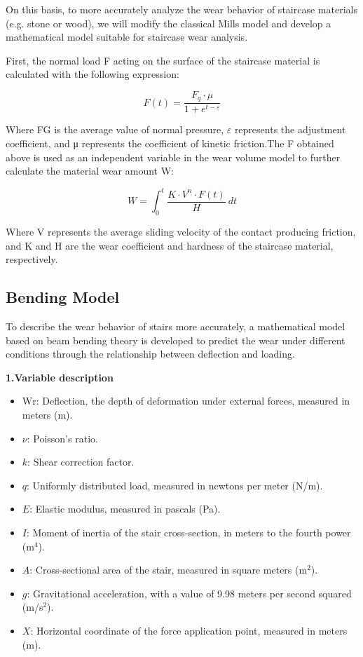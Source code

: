 \documentclass{mcmthesis}
\begin{document}
On this basis, to more accurately analyze the wear behavior of staircase materials (e.g. stone or wood), we will modify the classical Mills model and develop a mathematical model suitable for staircase wear analysis.

First, the normal load F acting on the surface of the staircase material is calculated with the following expression:

\[ F(t) = \frac{F_{q} \cdot \mu}{1 + e^{t - \varepsilon }} \]

Where FG is the average value of normal pressure, $\varepsilon$  represents the adjustment coefficient, and μ represents the coefficient of kinetic friction.The F obtained above is used as an independent variable in the wear volume model to further calculate the material wear amount W:


\[ W = \int_{0}^{t} \frac{K \cdot V^{n} \cdot F(t)}{H} \ dt \]

Where V represents the average sliding velocity of the contact producing friction, and K and H are the wear coefficient and hardness of the staircase material, respectively.
\subsection{Bending Model}
To describe the wear behavior of stairs more accurately, a mathematical model based on beam bending theory is developed to predict the wear under different conditions through the relationship between deflection and loading.

\textbf{1.Variable description}
\begin{itemize}

\item \( \text{Wr} \): Deflection, the depth of deformation under external forces, measured in meters (m). 

\item \( \nu \): Poisson's ratio. 

\item \( k \): Shear correction factor. 

\item \( q \): Uniformly distributed load, measured in newtons per meter (N/m). 

\item \( E \): Elastic modulus, measured in pascals (Pa). 

\item \( I \): Moment of inertia of the stair cross-section, in meters to the fourth power (m\(^4\)). 

\item \( A \): Cross-sectional area of the stair, measured in square meters (m\(^2\)). 

\item \( g \): Gravitational acceleration, with a value of 9.98 meters per second squared (m/s\(^2\)). 

\item \( X \): Horizontal coordinate of the force application point, measured in meters (m). 



 \end{itemize}
\end{document}
